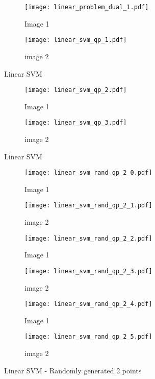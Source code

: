 \documentclass[10pt, a4paper,reqno]{amsart}
\begin{document}
\begin{figure}[H]
	\centering	
	\begin{subfigure}{1.0\textwidth}
		\centering
		\texttt{[image: linear\_problem\_dual\_1.pdf]}
		\caption{Image 1}
	\end{subfigure}
	\begin{subfigure}{1.0\textwidth}
		\centering
		\texttt{[image: linear\_svm\_qp\_1.pdf]}
		\caption{image 2}
	\end{subfigure}
	\caption{Linear SVM}
\end{figure}

\begin{figure}[H]
	\centering	
	\begin{subfigure}{1.0\textwidth}
		\centering
		\texttt{[image: linear\_svm\_qp\_2.pdf]}
		\caption{Image 1}
	\end{subfigure}
	\begin{subfigure}{1.0\textwidth}
		\centering
		\texttt{[image: linear\_svm\_qp\_3.pdf]}
		\caption{image 2}
	\end{subfigure}
	\caption{Linear SVM}
\end{figure}

\begin{figure}[H]
	\centering	
	\begin{subfigure}{0.5\textwidth}
		\centering
		\texttt{[image: linear\_svm\_rand\_qp\_2\_0.pdf]}
		\caption{Image 1}
	\end{subfigure}%
	\begin{subfigure}{0.5\textwidth}
		\centering
		\texttt{[image: linear\_svm\_rand\_qp\_2\_1.pdf]}
		\caption{image 2}
	\end{subfigure}
	\begin{subfigure}{0.5\textwidth}
		\centering
		\texttt{[image: linear\_svm\_rand\_qp\_2\_2.pdf]}
		\caption{Image 1}
	\end{subfigure}%
	\begin{subfigure}{0.5\textwidth}
		\centering
		\texttt{[image: linear\_svm\_rand\_qp\_2\_3.pdf]}
		\caption{image 2}
	\end{subfigure}
	\begin{subfigure}{0.5\textwidth}
		\centering
		\texttt{[image: linear\_svm\_rand\_qp\_2\_4.pdf]}
		\caption{Image 1}
	\end{subfigure}%
	\begin{subfigure}{0.5\textwidth}
		\centering
		\texttt{[image: linear\_svm\_rand\_qp\_2\_5.pdf]}
		\caption{image 2}
	\end{subfigure}
	\caption{Linear SVM - Randomly generated 2 points}
\end{figure}
\end{document}

